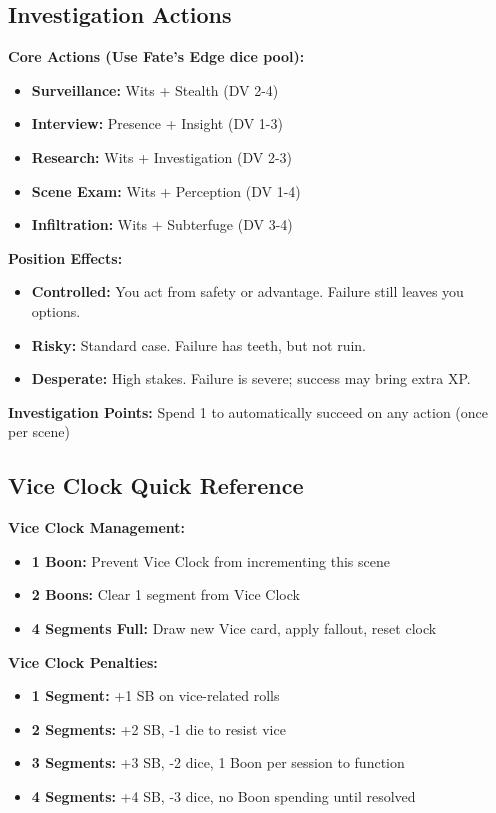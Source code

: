 \documentclass[11pt]{article}
\begin{document}
\subsection{Investigation Actions}

\textbf{Core Actions (Use Fate's Edge dice pool):}
\begin{itemize}
\item \textbf{Surveillance:} Wits + Stealth (DV 2-4)
\item \textbf{Interview:} Presence + Insight (DV 1-3)
\item \textbf{Research:} Wits + Investigation (DV 2-3)
\item \textbf{Scene Exam:} Wits + Perception (DV 1-4)
\item \textbf{Infiltration:} Wits + Subterfuge (DV 3-4)
\end{itemize}

\textbf{Position Effects:}
\begin{itemize}
\item \textbf{Controlled:} You act from safety or advantage. Failure still leaves you options.
\item \textbf{Risky:} Standard case. Failure has teeth, but not ruin.
\item \textbf{Desperate:} High stakes. Failure is severe; success may bring extra XP.
\end{itemize}

\textbf{Investigation Points:} Spend 1 to automatically succeed on any action (once per scene)

\subsection{Vice Clock Quick Reference}

\textbf{Vice Clock Management:}
\begin{itemize}
\item \textbf{1 Boon:} Prevent Vice Clock from incrementing this scene
\item \textbf{2 Boons:} Clear 1 segment from Vice Clock
\item \textbf{4 Segments Full:} Draw new Vice card, apply fallout, reset clock
\end{itemize}

\textbf{Vice Clock Penalties:}
\begin{itemize}
\item \textbf{1 Segment:} +1 SB on vice-related rolls
\item \textbf{2 Segments:} +2 SB, -1 die to resist vice
\item \textbf{3 Segments:} +3 SB, -2 dice, 1 Boon per session to function
\item \textbf{4 Segments:} +4 SB, -3 dice, no Boon spending until resolved
\end{itemize}
\end{document}
